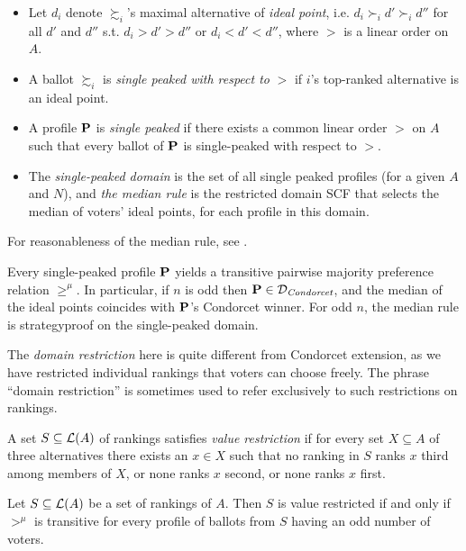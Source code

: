 \begin{definition}
    \begin{itemize}
        \item Let $d_i$ denote $\succsim_i$'s maximal alternative of \emph{ideal point}, i.e. $d_i \succ_i d' \succ_i d''$ for all $d'$ and $d''$ s.t. $d_i > d' >d''$ or $d_i <d'<d''$, where $>$ is a linear order on $A$.
        \item A ballot $\succsim_i$ is \emph{single peaked with respect to} $>$ if $i$'s top-ranked alternative is an ideal point.
        \item A profile $\mathbf{P}$ is \emph{single peaked} if there exists a common linear order $>$ on $A$ such that every ballot of $\mathbf{P}$ is single-peaked with respect to $>$.
        \item The \emph{single-peaked domain} is the set of all single peaked profiles (for a given $A$ and $N$), and \emph{the median rule} is the restricted domain SCF that selects the median of voters' ideal points, for each profile in this domain.
    \end{itemize}
\end{definition}

For reasonableness of the median rule, see \textcite{Black1987}.

\begin{theorem}
    Every single-peaked profile $\mathbf{P}$ yields a transitive pairwise majority preference relation $\geqslant^\mu$. In particular, if $n$ is odd then $\mathbf{P} \in \mathcal{D}_\textit{Condorcet}$, and the median of the ideal points coincides with $\mathbf{P}$'s Condorcet winner. For odd $n$, the median rule is strategyproof on the single-peaked domain.
\end{theorem}

The \emph{domain restriction} here is quite different from Condorcet extension, as we have restricted individual rankings that voters can choose freely. The phrase ``domain restriction'' is sometimes used to refer exclusively to such restrictions on rankings.

\begin{definition}
    A set $S \subseteq \mathcal{L}(A)$ of rankings satisfies \emph{value restriction} if for every set $X \subseteq A$ of three alternatives there exists an $x \in X$ such that no ranking in $S$ ranks $x$ third among members of $X$, or none ranks $x$ second, or none ranks $x$ first.
\end{definition}

\begin{theorem}
    Let $S \subseteq \mathcal{L}(A)$ be a set of rankings of $A$. Then $S$ is value restricted if and only if $>^\mu$ is transitive for every profile of ballots from $S$ having an odd number of voters.
\end{theorem}

